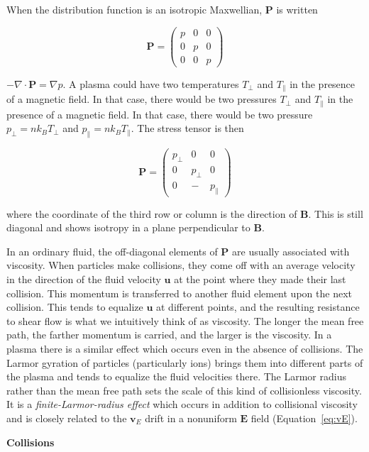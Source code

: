 \documentclass[
  notoc %
]{tufte-book}
\begin{document}
When the distribution function is an isotropic Maxwellian,
\(\mathbf{P}\) is written

\[
\mathbf{P} = \begin{pmatrix}p & 0 & 0 \\ 0 & p & 0 \\ 0 & 0 & p\end{pmatrix}
\]

\(-\nabla\cdot\mathbf{P} = \nabla p\). A plasma could have two
temperatures \(T_\perp\) and \(T_\parallel\) in the presence of a
magnetic field. In that case, there would be two pressures \(T_\perp\)
and \(T_\parallel\) in the presence of a magnetic field. In that case,
there would be two pressure \(p_\perp = nk_B T_\perp\) and
\(p_\parallel = nk_B T_\parallel\). The stress tensor is then

\[
\mathbf{P} = \begin{pmatrix}p_\perp & 0 & 0 \\ 0 & p_\perp & 0 \\ 0 & - & p_\parallel\end{pmatrix}
\]

where the coordinate of the third row or column is the direction of
\(\mathbf{B}\). This is still diagonal and shows isotropy in a plane
perpendicular to \(\mathbf{B}\).

In an ordinary fluid, the off-diagonal elements of \(\mathbf{P}\) are
usually associated with viscosity. When particles make collisions, they
come off with an average velocity in the direction of the fluid velocity
\(\mathbf{u}\) at the point where they made their last collision. This
momentum is transferred to another fluid element upon the next
collision. This tends to equalize \(\mathbf{u}\) at different points,
and the resulting resistance to shear flow is what we intuitively think
of as viscosity. The longer the mean free path, the farther momentum is
carried, and the larger is the viscosity. In a plasma there is a similar
effect which occurs even in the absence of collisions. The Larmor
gyration of particles (particularly ions) brings them into different
parts of the plasma and tends to equalize the fluid velocities there.
The Larmor radius rather than the mean free path sets the scale of this
kind of collisionless viscosity. It is a \emph{finite-Larmor-radius
effect} which occurs in addition to collisional viscosity and is closely
related to the \(\mathbf{v}_E\) drift in a nonuniform \(\mathbf{E}\)
field (Equation~\ref{eq:vE}).

\textbf{Collisions}
\end{document}
